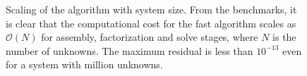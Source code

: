 \documentclass[final,leqno]{siamltex}
\begin{document}
\begin{figure}[!htbp]
{}
\caption{Scaling of the algorithm with system size. From the benchmarks, it is clear that the computational cost for the fast algorithm scales as $\mathcal{O}(N)$ for assembly, factorization and solve stages, where $N$ is the number of unknowns. The maximum residual is less than $10^{-13}$ even for a system with million unknowns.}
\label{figure_benchmark1}
\end{figure}
\end{document}
